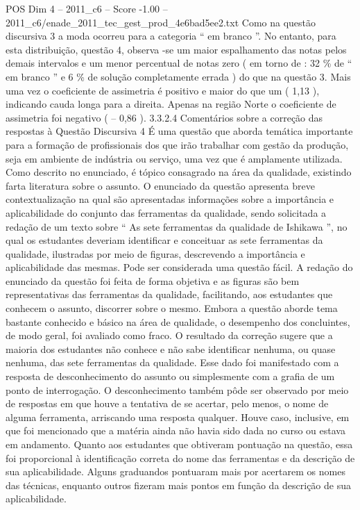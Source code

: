 \begin{textsample}{POS Dim 4 – 2011\_c6 – Score -1.00 – 2011\_c6/enade\_2011\_tec\_gest\_prod\_4e6bad5ee2.txt}
Como na questão discursiva 3 a moda ocorreu para a categoria “ em branco ”.
No entanto, para esta distribuição, questão 4, observa -se um maior espalhamento das notas pelos demais intervalos e um menor percentual de notas zero ( em torno de : 32 \% de “ em branco ” e 6 \% de solução completamente errada ) do que na questão 3.
Mais uma vez o coeficiente de assimetria é positivo e maior do que um ( 1,13 ), indicando cauda longa para a direita.
Apenas na região Norte o coeficiente de assimetria foi negativo ( – 0,86 ). 3.3.2.4 Comentários sobre a correção das respostas à Questão Discursiva 4 É uma questão que aborda temática importante para a formação de profissionais dos que irão trabalhar com gestão da produção, seja em ambiente de indústria ou serviço, uma vez que é amplamente utilizada.
Como descrito no enunciado, é tópico consagrado na área da qualidade, existindo farta literatura sobre o assunto.
O enunciado da questão apresenta breve contextualização na qual são apresentadas informações sobre a importância e aplicabilidade do conjunto das ferramentas da qualidade, sendo solicitada a redação de um texto sobre “ As sete ferramentas da qualidade de Ishikawa ”, no qual os estudantes deveriam identificar e conceituar as sete ferramentas da qualidade, ilustradas por meio de figuras, descrevendo a importância e aplicabilidade das mesmas.
Pode ser considerada uma questão fácil.
A redação do enunciado da questão foi feita de forma objetiva e as figuras são bem representativas das ferramentas da qualidade, facilitando, aos estudantes que conhecem o assunto, discorrer sobre o mesmo.
Embora a questão aborde tema bastante conhecido e básico na área de qualidade, o desempenho dos concluintes, de modo geral, foi avaliado como fraco.
O resultado da correção sugere que a maioria dos estudantes não conhece e não sabe identificar nenhuma, ou quase nenhuma, das sete ferramentas da qualidade.
Esse dado foi manifestado com a resposta de desconhecimento do assunto ou simplesmente com a grafia de um ponto de interrogação.
O desconhecimento também pôde ser observado por meio de respostas em que houve a tentativa de se acertar, pelo menos, o nome de alguma ferramenta, arriscando uma resposta qualquer.
Houve caso, inclusive, em que foi mencionado que a matéria ainda não havia sido dada no curso ou estava em andamento.
Quanto aos estudantes que obtiveram pontuação na questão, essa foi proporcional à identificação correta do nome das ferramentas e da descrição de sua aplicabilidade.
Alguns graduandos pontuaram mais por acertarem os nomes das técnicas, enquanto outros fizeram mais pontos em função da descrição de sua aplicabilidade.

\end{textsample}
